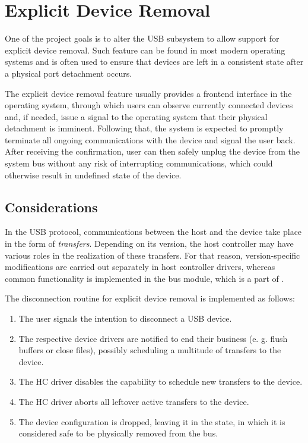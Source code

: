 \section{Explicit Device Removal}

One of the project goals is to alter the USB subsystem to allow support for
explicit device removal. Such feature can be found in most modern operating
systems and is often used to ensure that devices are left in a consistent state
after a physical port detachment occurs.

The explicit device removal feature usually provides a frontend interface in
the operating system, through which users can observe currently connected
devices and, if needed, issue a signal to the operating system that their
physical detachment is imminent. Following that, the system is expected to
promptly terminate all ongoing communications with the device and signal the
user back. After receiving the confirmation, user can then safely unplug the
device from the system bus without any risk of interrupting communications,
which could otherwise result in undefined state of the device.


\subsection{Considerations}

In the USB protocol, communications between the host and the device take place
in the form of \textit{transfers}. Depending on its version, the host controller
may have various roles in the realization of these transfers. For that reason,
version-specific modifications are carried out separately in host controller
drivers, whereas common functionality is implemented in the bus module, which is
a part of .

The disconnection routine for explicit device removal is implemented as follows:
~
\begin{enumerate}
	\item The user signals the intention to disconnect a USB device.
	\item The respective device drivers are notified to end their business (e.
		g. flush buffers or close files), possibly scheduling a multitude of
		transfers to the device.
	\item The HC driver disables the capability to schedule new transfers to the
		device.
	\item The HC driver aborts all leftover active transfers to the device.
	\item The device configuration is dropped, leaving it in the
		 state, in which it is considered safe to be
		physically removed from the bus.
\end{enumerate}

